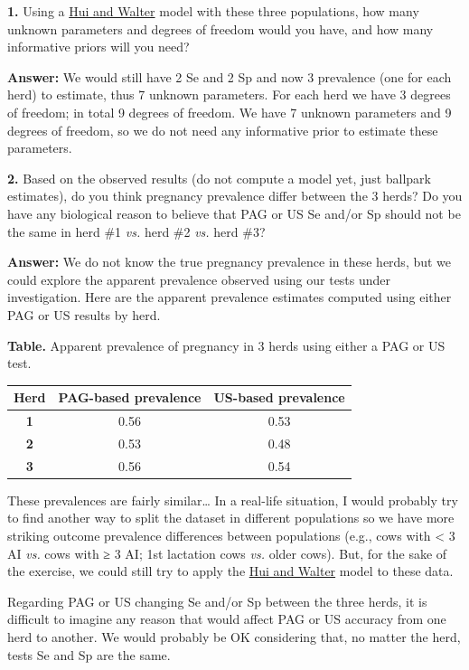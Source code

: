 \documentclass[
]{book}
\begin{document}
\textbf{1.} Using a \href{https://www.jstor.org/stable/2530508?seq=1}{Hui and Walter} model with these three populations, how many unknown parameters and degrees of freedom would you have, and how many informative priors will you need?

\textbf{Answer:} We would still have 2 Se and 2 Sp and now 3 prevalence (one for each herd) to estimate, thus 7 unknown parameters. For each herd we have 3 degrees of freedom; in total 9 degrees of freedom. We have 7 unknown parameters and 9 degrees of freedom, so we do not need any informative prior to estimate these parameters.

\textbf{2.} Based on the observed results (do not compute a model yet, just ballpark estimates), do you think pregnancy prevalence differ between the 3 herds? Do you have any biological reason to believe that PAG or US Se and/or Sp should not be the same in herd \#1 \emph{vs.} herd \#2 \emph{vs.} herd \#3?

\textbf{Answer:} We do not know the true pregnancy prevalence in these herds, but we could explore the apparent prevalence observed using our tests under investigation. Here are the apparent prevalence estimates computed using either PAG or US results by herd.

\textbf{Table.} Apparent prevalence of pregnancy in 3 herds using either a PAG or US test.

\begin{longtable}[]{@{}ccc@{}}
\toprule\noalign{}
\textbf{Herd} & \textbf{PAG-based prevalence} & \textbf{US-based prevalence} \\
\midrule\noalign{}
\endhead
\bottomrule\noalign{}
\endlastfoot
\textbf{1} & 0.56 & 0.53 \\
\textbf{2} & 0.53 & 0.48 \\
\textbf{3} & 0.56 & 0.54 \\
\end{longtable}

These prevalences are fairly similar\ldots{} In a real-life situation, I would probably try to find another way to split the dataset in different populations so we have more striking outcome prevalence differences between populations (e.g., cows with \textless{} 3 AI \emph{vs.} cows with ≥ 3 AI; 1st lactation cows \emph{vs.} older cows). But, for the sake of the exercise, we could still try to apply the \href{https://www.jstor.org/stable/2530508?seq=1}{Hui and Walter} model to these data.

Regarding PAG or US changing Se and/or Sp between the three herds, it is difficult to imagine any reason that would affect PAG or US accuracy from one herd to another. We would probably be OK considering that, no matter the herd, tests Se and Sp are the same.
\end{document}
